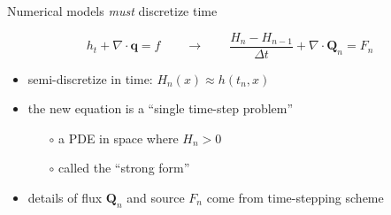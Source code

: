 \documentclass{beamer}
\newcommand\bq{\mathbf{q}}
\newcommand\bQ{\mathbf{Q}}
\newcommand{\Div}{\nabla\cdot}
\begin{document}
\begin{frame}{Numerical models \emph{must} discretize time}

$$h_t + \Div\bq = f \qquad \to \qquad \frac{H_n - H_{n-1}}{\Delta t} + \Div \bQ_n = F_n$$

  \begin{itemize}
  \item semi-discretize in time: $H_n(x) \approx h(t_n,x)$
  \item the new equation is a ``single time-step problem''
    \begin{itemize}
    \item[$\circ$] a PDE in space \alert{where $H_n>0$}
    \item[$\circ$] called the ``strong form''
    \end{itemize}
  \item details of flux $\bQ_n$ and source $F_n$ come from time-stepping scheme
  \end{itemize}
\end{frame}
\end{document}
